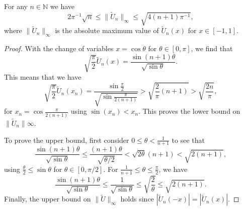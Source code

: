 \documentclass[10pt,a4paper]{amsart}
\begin{document}
\begin{lemma}\label{lem:Unbound}
For any $n\in\mathbb{N}$ we have 
\begin{equation*}
    2\pi^{-1}\sqrt{n} \leq \|\tilde{U}_n\|_\infty \leq \sqrt{4(n+1)\pi^{-1}},
\end{equation*} 
where $\|\tilde{U}_n\|_\infty$ is the absolute maximum value of $\tilde{U}_n(x)$ for $x\in[-1,1]$. 
\end{lemma}

\begin{proof}
With the change of variables $x=\cos\theta$ for $\theta\in[0, \pi]$, we find that 
\begin{equation*}
    \sqrt{\frac{\pi}{2}}\tilde{U}_n(x) = \frac{\sin (n+1)\theta}{\sqrt{\sin{\theta}}}.
\end{equation*}
This means that we have 
\begin{equation*}
    \sqrt{\frac{\pi}{2}}\tilde{U}_n(x_n) = \frac{\sin{\frac{\pi}{2}}}{\sqrt{\sin{\frac{\pi}{2(n+1)}}}} > \sqrt{\frac{2}{\pi}(n+1)}> \sqrt{\frac{2n}{\pi}},
\end{equation*}
for $x_n=\cos\frac{\pi}{2(n+1)}$ using $\sin(x_n)< x_n$. This proves the lower bound on $\|\tilde{U}_n\|\infty$. 

\par To prove the upper bound, first consider $0\leq \theta<\frac{1}{n+1}$ to see that
\begin{equation*}
    \frac{\sin (n+1)\theta}{\sqrt{\sin{\theta}}} \leq \frac{(n+1)\theta}{\sqrt{\theta/2}} < \sqrt{2\theta}(n+1) < \sqrt{2(n+1)},
\end{equation*}
using $\frac{\theta}{2}\leq \sin\theta$ for $\theta\in[0, \pi/2]$. For $\frac{1}{n+1}\leq \theta \leq \frac{\pi}{2}$, we have
\begin{equation*}
    \frac{\sin (n+1)\theta}{\sqrt{\sin{\theta}}} \leq \frac{1}{\sqrt{\sin\theta}} \leq \sqrt{\frac{2}{\theta}} \leq \sqrt{2(n+1)}. 
\end{equation*}
Finally, the upper bound on $\|\tilde{U}\|_\infty$ holds since $|\tilde{U}_n(-x)| = |\tilde{U}_n(x)|$. 
\end{proof}
\end{document}
